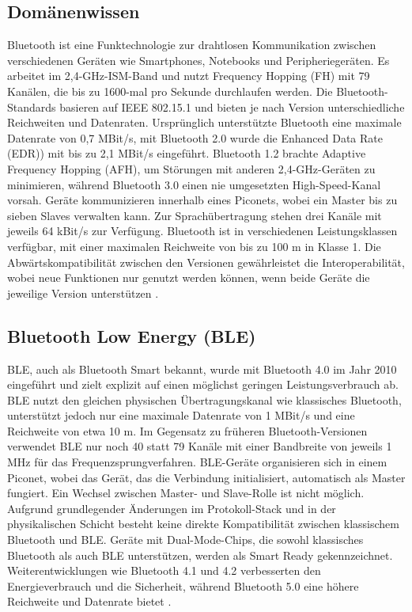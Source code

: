 \subsection{Domänenwissen}
Bluetooth ist eine Funktechnologie zur drahtlosen Kommunikation zwischen verschiedenen Geräten wie Smartphones, Notebooks und Peripheriegeräten. Es arbeitet im 2,4-GHz-ISM-Band und nutzt Frequency Hopping (FH) mit 79 Kanälen, die bis zu 1600-mal pro Sekunde durchlaufen werden. Die Bluetooth-Standards basieren auf IEEE 802.15.1 und bieten je nach Version unterschiedliche Reichweiten und Datenraten. Ursprünglich unterstützte Bluetooth eine maximale Datenrate von 0,7 MBit/s, mit Bluetooth 2.0 wurde die Enhanced Data Rate (EDR)) mit bis zu 2,1 MBit/s eingeführt. Bluetooth 1.2 brachte Adaptive Frequency Hopping (AFH), um Störungen mit anderen 2,4-GHz-Geräten zu minimieren, während Bluetooth 3.0 einen nie umgesetzten High-Speed-Kanal vorsah. Geräte kommunizieren innerhalb eines Piconets, wobei ein Master bis zu sieben Slaves verwalten kann. Zur Sprachübertragung stehen drei Kanäle mit jeweils 64 kBit/s zur Verfügung. Bluetooth ist in verschiedenen Leistungsklassen verfügbar, mit einer maximalen Reichweite von bis zu 100 m in Klasse 1. Die Abwärtskompatibilität zwischen den Versionen gewährleistet die Interoperabilität, wobei neue Funktionen nur genutzt werden können, wenn beide Geräte die jeweilige Version unterstützen \cite{Heydon:2012, Afaneh:2018,IEEE:2005}. 

\subsection{Bluetooth Low Energy (BLE)}

BLE, auch als Bluetooth Smart bekannt, wurde mit Bluetooth 4.0 im Jahr 2010 eingeführt und zielt explizit auf einen möglichst geringen Leistungsverbrauch ab. BLE nutzt den gleichen physischen Übertragungskanal wie klassisches Bluetooth, unterstützt jedoch nur eine maximale Datenrate von 1 MBit/s und eine Reichweite von etwa 10 m. Im Gegensatz zu früheren Bluetooth-Versionen verwendet BLE nur noch 40 statt 79 Kanäle mit einer Bandbreite von jeweils 1 MHz für das Frequenzsprungverfahren. BLE-Geräte organisieren sich in einem Piconet, wobei das Gerät, das die Verbindung initialisiert, automatisch als Master fungiert. Ein Wechsel zwischen Master- und Slave-Rolle ist nicht möglich. Aufgrund grundlegender Änderungen im Protokoll-Stack und in der physikalischen Schicht besteht keine direkte Kompatibilität zwischen klassischem Bluetooth und BLE. Geräte mit Dual-Mode-Chips, die sowohl klassisches Bluetooth als auch BLE unterstützen, werden als Smart Ready gekennzeichnet. Weiterentwicklungen wie Bluetooth 4.1 und 4.2 verbesserten den Energieverbrauch und die Sicherheit, während Bluetooth 5.0 eine höhere Reichweite und Datenrate bietet \cite{Afaneh:2018}.

